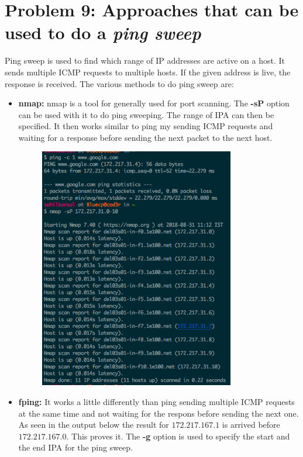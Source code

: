 \documentclass[]{report}
\begin{document}
\section{Problem 9: Approaches that can be used to do a \textit{ping sweep}}
Ping sweep is used to find which range of IP addresses are active on a host. It sends multiple ICMP requests to multiple hosts. If the given address is live, the response is received. The various methods to do ping sweep are:
\begin{itemize}
  	\item \textbf{nmap:}
	nmap is a tool for generally used for port scanning. The \textbf{-sP} option can be used with it to do ping sweeping. The range of IPA can then be specified. It then works similar to ping my sending ICMP requests and waiting for a response before sending the next packet to the next host. 
	\begin{figure}[H]
		\vspace{0pt}
		\includegraphics[height = 300pt, keepaspectratio]{Snapshots/exe9/q9_1.png}
	\end{figure}
	\item \textbf{fping:}
	It works a little differently than ping sending multiple ICMP requests at the same time and not waiting for the respons before sending the next one. As seen in the output below the result for $172.217.167.1$ is arrived before $172.217.167.0$. This proves it. The \textbf{-g} option is used to specify the start and the end IPA for the ping sweep. 
	\begin{figure}[H]

\end{figure}
\end{itemize}
\end{document}
